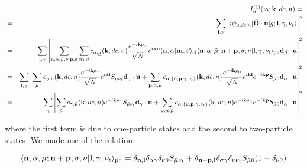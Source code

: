 \documentclass[pt12]{article}
\newcommand{\beq}{\begin{equation}}
\newcommand{\eeq}{\end{equation}}
\newcommand{\bfk}{\mathbf{k}}
\newcommand{\bfn}{\mathbf{n}}
\newcommand{\bfm}{\mathbf{m}}
\newcommand{\bfd}{\mathbf{d}}
\newcommand{\bfu}{\mathbf{u}}
\newcommand{\bfl}{\mathbf{l}}
\newcommand{\bfp}{\mathbf{p}}
\newcommand{\tmu}{\tilde{\mu}}
\newcommand{\umu}{\underline{\mu}}
\begin{document}
\begin{eqnarray}
&&I_\bfu^{(1)}(\nu_t;\bfk,dc,n) =  \\ \nonumber
&=& \sum_{\bfl,\gamma}\left|\langle\psi_{\bfk,dc,n}|\hat{\mathbf{D}}\cdot
\mathbf{u} |g;\bfl,\gamma,\nu_t\rangle\right|^2\\ \nonumber
&=&\sum_{\bfl,\gamma}\left|\sum_{\bfn,\alpha,\tmu,\nu,\bfp,\sigma}\sum_{\bfm,\beta}
c_{\alpha,\umu}(\bfk,dc,n) \frac{e^{-i\bfk
\mathbf{\rho}_\alpha}}{\sqrt{N}} e^{i \bfk \bfn} \langle
\bfn,\alpha|\bfm,\beta\rangle_{\rm el}
\langle\bfn,\alpha,\tmu;\bfn+\bfp,\sigma,\nu|\bfl,\gamma,\nu_t\rangle_{\rm ph} \bfd_\beta\cdot
\mathbf{u}\right|^2
%
\\ \nonumber
&=&\sum_{\bfl,\gamma}\left|\sum_{\tmu}
c_{\gamma,\tmu}(\bfk,dc,n) \frac{e^{-i\bfk
\mathbf{\rho}_\gamma}}{\sqrt{N}} e^{i \bfk \bfl}S_{\tmu\nu_t} \bfd_\gamma\cdot
\mathbf{u}+ \sum_{\bfp,\alpha,\tmu}
c_{\alpha,\{\tmu,\bfp,\gamma,\nu_t\}}(\bfk,dc,n) \frac{e^{-i\bfk
\mathbf{\rho}_\alpha}}{\sqrt{N}} e^{i \bfk \bfl}e^{-i \bfk \bfp} S_{\tmu 0} \bfd_\alpha\cdot
\mathbf{u}\right|^2 \\ \nonumber
%
&=&\sum_{\gamma}\left|\sum_{\tmu}
c_{\gamma,\tmu}(\bfk,dc,n) e^{-i\bfk
\mathbf{\rho}_\gamma} S_{\tmu\nu_t} \bfd_\gamma\cdot
\mathbf{u}+ \sum_{\bfp,\alpha,\tmu}
c_{\alpha,\{\tmu,\bfp,\gamma,\nu_t\}}(\bfk,dc,n) e^{-i\bfk
\mathbf{\rho}_\alpha}e^{-i \bfk \bfp} S_{\tmu 0} \bfd_\alpha\cdot
\mathbf{u}\right|^2
\end{eqnarray}

where the first term is due to one-particle states and the second to two-particle states.  We made use of the relation

\beq
\langle\bfn,\alpha,\tmu;\bfn+\bfp,\sigma,\nu|\bfl,\gamma,\nu_t\rangle_{\rm ph}=\delta_{\bfn,\bfl} \delta_{\alpha\gamma} \delta_{\nu 0} S_{\tmu\nu_t}+\delta_{\bfn+\bfp,\bfl} \delta_{\sigma\gamma} \delta_{\nu \nu_t} S_{\tmu 0} (1-\delta_{\nu 0} )
\eeq
\end{document}
